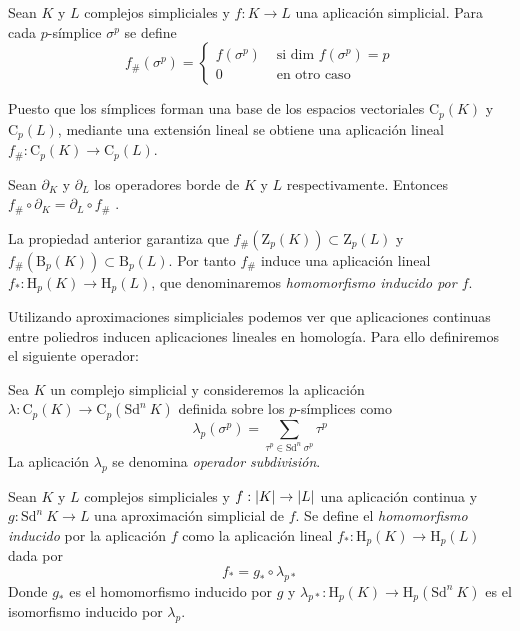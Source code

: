 Sean $K$ y $L$ complejos simpliciales y $f: K \to L$ una aplicación simplicial. Para cada $p$-símplice $\sigma^p$ se define
\[
f_{\#}(\sigma^p) = 
\begin{cases}
f(\sigma^p)	& \text{ si } \text{dim } f(\sigma^p) = p \\ 
0 			& \text{ en otro caso }
\end{cases}
\]

Puesto que los símplices forman una base de los espacios vectoriales $\text{C}_p(K)$ y $\text{C}_p(L)$, mediante una extensión lineal se obtiene una aplicación lineal $f_{\#}: \text{C}_p(K) \to \text{C}_p(L)$.

\begin{property}
Sean $\partial_K$ y $\partial_L$ los operadores borde de $K$ y $L$ respectivamente. Entonces $f_{\#}\circ \partial_K = \partial_L \circ f_{\#}$ \cite{libroEH}.
\end{property}
La propiedad anterior garantiza que $f_{\#}(\text{Z}_p(K)) \subset \text{Z}_p(L)$ y $f_{\#}(\text{B}_p(K)) \subset \text{B}_p(L)$. Por tanto $f_{\#}$ induce una aplicación lineal $f_{*}: \text{H}_p(K) \to \text{H}_p(L)$, que denominaremos \emph{homomorfismo inducido por $f$}.

Utilizando aproximaciones simpliciales podemos ver que aplicaciones continuas entre poliedros inducen aplicaciones lineales en homología. Para ello definiremos el siguiente operador:

\begin{definition}
\begin{sloppypar}
Sea $K$ un complejo simplicial y consideremos la aplicación ${\lambda: \text{C}_p(K) \to \text{C}_p(\text{Sd}^n\ K)}$ definida sobre los $p$-símplices como
\[
\lambda_p(\sigma^p) = \sum_{\tau^p \in \text{Sd}^n\ \sigma^p} \tau^p
\]
La aplicación $\lambda_p$ se denomina \emph{operador subdivisión}.
\end{sloppypar} 
\end{definition}

\begin{sloppypar}
Sean $K$ y $L$ complejos simpliciales y ${f: \lvert K\rvert \to \lvert L\rvert}$ una aplicación continua y ${g: \text{Sd}^n\ K \to L}$ una aproximación simplicial de $f$. Se define el \emph{homomorfismo inducido} por la aplicación $f$ como la aplicación lineal ${f_{*}: \text{H}_p(K) \to \text{H}_p(L)}$ dada por
\[
f_{*} = g_{*} \circ \lambda_{p*}
\]
Donde $g_{*}$ es el homomorfismo inducido por $g$ y ${\lambda_{p*}: \text{H}_p(K) \to \text{H}_p(\text{Sd}^n\ K)}$ es el isomorfismo inducido por $\lambda_p$.
\end{sloppypar}


